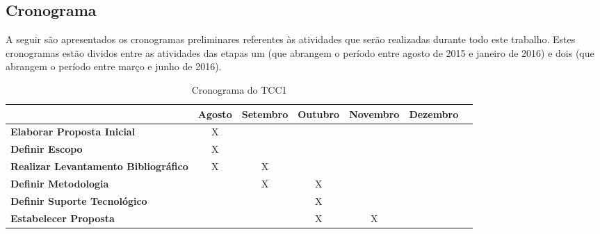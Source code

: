 \subsection{Cronograma}

A seguir são apresentados os cronogramas preliminares referentes às atividades que serão realizadas durante todo este trabalho. Estes cronogramas estão dividos entre as atividades das etapas um (que abrangem o período entre agosto de 2015 e janeiro de 2016) e dois (que abrangem o período entre março e junho de 2016).

\begin{table}[h]
\centering
\caption{Cronograma do TCC1}
\label{cronograma tcc1}
\begin{adjustbox}{width=\textwidth}
\begin{tabular}{|l|c|c|c|c|c|c|}
\hline
                                      			& \multicolumn{1}{l|}{\textbf{Agosto}} & \multicolumn{1}{l|}{\textbf{Setembro}} & \multicolumn{1}{l|}{\textbf{Outubro}} & \multicolumn{1}{l|}{\textbf{Novembro}} & \multicolumn{1}{l|}{\textbf{Dezembro}} \\ \hline
\textbf{Elaborar Proposta Inicial}              & X                           		   &                               			&                              			&                               		 &                               		  \\ \hline
\textbf{Definir Escopo}                         & X                           		   &                               			&                              			&                               		 &                               		  \\ \hline
\textbf{Realizar Levantamento Bibliográfico}    & X                           		   & X                             			&                              			&                               		 &                               		  \\ \hline
\textbf{Definir Metodologia} 					&                             		   & X                             			& X                            			&                               		 &                               		  \\ \hline
\textbf{Definir Suporte Tecnológico}            &                             		   &                               			& X                            			&                               		 &                               		  \\ \hline
\textbf{Estabelecer Proposta}                   &                             		   &                               			& X                            			& X                             		 &                               		  \\ \hline

\end{tabular}
\end{adjustbox}
\end{table}
